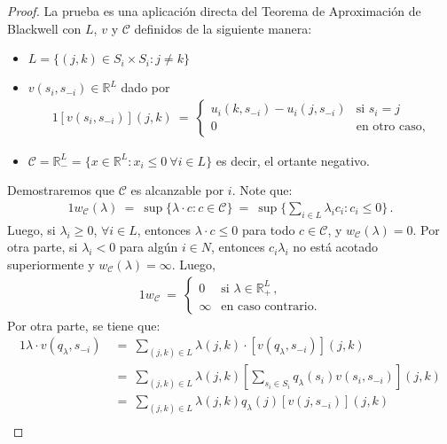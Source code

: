 \begin{proof}
La prueba es una aplicación directa del Teorema de Aproximación de Blackwell con $L$, $v$ y $\mathcal{C}$ definidos de la siguiente manera:
\begin{itemize}[noitemsep]
  \item $L = \{ (j, k) \in S_i \times S_{i}  : j \neq k \}$
  \item $v(s_i, s_{-i}) \in \mathbb{R}^L$ dado por
    \begin{alignat}{1}
      [v(s_i, s_{-i})](j, k)\ =\  
        \begin{cases}
          u_i(k, s_{-i}) - u_i(j, s_{-i}) & \text{si } s_i = j \\
          0 & \text{en otro caso,}
        \end{cases}
    \end{alignat}
  \item $\mathcal{C} = \mathbb{R}^L_{-} = \{x \in \mathbb{R}^L : x_i \leq 0\ \forall i \in L \}$ es decir, el ortante negativo.
\end{itemize}
Demostraremos que $\mathcal{C}$ es alcanzable por $i$.
Note que:
\begin{alignat}{1}
	w_{\mathcal{C}}(\lambda)\ =\ \sup\{\lambda \cdot c : c \in \mathcal{C} \}\ =\ \sup \{\sum_{i \in L} \lambda_i c_i : c_i \leq 0 \} \,.
\end{alignat}
Luego, si $\lambda_i \geq 0$, $\forall i \in L$, entonces $\lambda \cdot c \leq 0$ para todo $c \in \mathcal{C}$, y $w_{\mathcal{C}}(\lambda) = 0$. Por otra parte, si $\lambda_i < 0$ para algún $i\in N$, entonces $c_i \lambda_i$ no está acotado superiormente y  $w_{\mathcal{C}}(\lambda) = \infty$. Luego,
\begin{alignat}{1}
  w_{\mathcal{C}}\ =\  
	\begin{cases}
	  0 & \text{si } \lambda \in \mathbb{R}^L_+ \,, \\
	  \infty & \text{en caso contrario.}
	\end{cases}
\end{alignat}
Por otra parte, se tiene que:
\begin{alignat}{1}
	\lambda \cdot v(q_{\lambda}, s_{-i})\ 
	  &=\ \sum_{(j,k) \in L} \lambda(j,k) \cdot [v(q_{\lambda}, s_{-i})](j, k) \\
	&=\ \sum_{(j,k) \in L} \lambda(j, k)\left[\sum_{s_i \in S_i} q_{\lambda}(s_i) v(s_i, s_{-i}) \right](j, k) \\
	&=\ \sum_{(j,k) \in L} \lambda(j, k) q_{\lambda}(j) [v(j, s_{-i})](j, k) \\

\end{alignat}
\end{proof}
